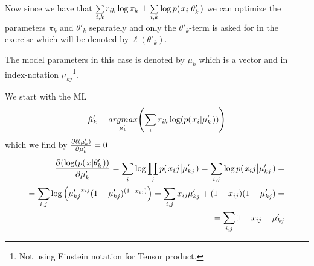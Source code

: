 \documentclass[a4paper,twoside=false,abstract=false,numbers=noenddot,
titlepage=false,headings=small,parskip=half,version=last]{scrartcl}
\begin{document}
\begin{solution}
    Now since we have that $\sum\limits_{i,k}r_{ik}\log\pi_k \perp
    \sum\limits_{i,k}\log p{(\left. x_i \middle\vert \theta'_k \right.)}$ we can optimize the parameters
    $\pi_k$ and $\theta'_k$ separately and only the $\theta'_k$-term is asked for in the
    exercise which will be denoted by $\ell(\theta'_k)$.

    The model parameters in this case is denoted by $\mu_k$ which is a vector
    and in index-notation $\mu_{kj}$\footnote{Not using Einstein notation for
    Tensor product.}.

    We start with the ML
    \begin{equation}
        \hat{\mu}'_k = \underset{\mu'_k}{argmax}{\left(\sum\limits_i r_{ik}\log(p{(\left. x_i \middle\vert \mu'_k \right.)})\right)}
    \end{equation}
    which we find by $\frac{\partial{\ell(\mu'_k)}}{\partial{\mu'_k}}=0$
    \begin{eqnarray}
        \frac{\partial{
            \left(
                \log(
                    p{(\left. x \middle\vert \theta'_k \right.)}
            \right)
        }}{\partial{
            \mu'_k
        }} = 
        \sum\limits_i\log \prod\limits_j p{(\left. x_ij \middle\vert \mu'_{kj} \right.)} =
        \sum\limits_{i,j}\log p{(\left. x_ij \middle\vert \mu'_{kj} \right.)} =  \\
        =\sum\limits_{i,j}\log \left(
            {\mu'_{kj}}^{x_{ij}}
            (1-{\mu'_{kj}})^{(1-x_{ij})}
        \right)=
        \sum\limits_{i,j} x_{ij}{\mu'_{kj}} + (1-x_{ij})({1-\mu'_{kj}}) =\\
        = \sum\limits_{i,j} 1 - x_{ij} - \mu'_{kj}
    \end{eqnarray}

\end{solution}

\end{document}
